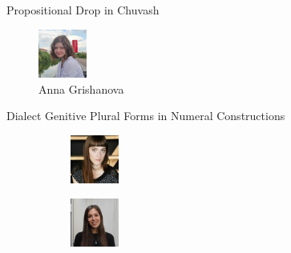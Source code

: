 \documentclass[
  ignorenonframetext,
  t]{beamer}
\begin{document}
\begin{frame}{Propositional Drop in Chuvash}
\label{propositional-drop-in-chuvash}
\begin{figure}[H]

{\centering \includegraphics[width=0.63in,height=\textheight]{images/grishanova.png}

}

\caption{Anna Grishanova}

\end{figure}%
\end{frame}

\begin{frame}{Dialect Genitive Plural Forms in Numeral Constructions}
\label{dialect-genitive-plural-forms-in-numeral-constructions}
\begin{figure}

\begin{minipage}{0.33\linewidth}

\begin{figure}[H]

{\centering \includegraphics[width=0.63in,height=\textheight]{images/zemicheva.jpeg}

}


\end{figure}%

\end{minipage}%
%
\begin{minipage}{0.33\linewidth}

\begin{figure}[H]

{\centering \includegraphics[width=0.63in,height=\textheight]{images/naccarato.jpg}

}



\end{figure}
\end{minipage}
\end{figure}
\end{frame}
\end{document}
